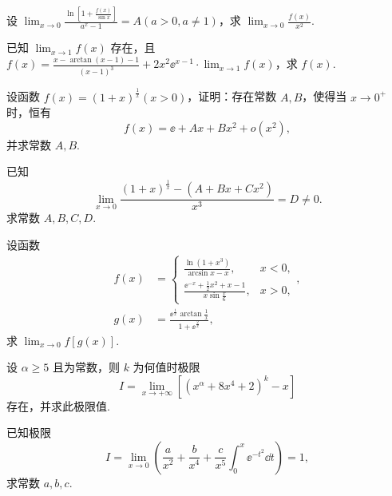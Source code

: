 	\begin{ti}
		设 $\lim_{x \to 0} \frac{\ln\left[ 1 + \frac{f(x)}{\sin x} \right]}{a^{x} - 1} = A (a > 0, a \ne 1)$，求 $\lim_{x \to 0}\frac{f(x)}{x^{2}}$.
	\end{ti}

	\begin{ti}
		已知 $\lim_{x \to 1} f(x)$ 存在，且 $f(x) = \frac{x - \arctan(x - 1) - 1}{(x - 1)^{3}} + 2x^{2} \ee^{x-1} \cdot \lim_{x \to 1} f(x)$，求 $f(x)$.
	\end{ti}

	\begin{ti}
		设函数 $f(x) = (1 + x)^{\frac{1}{x}}(x > 0)$，证明：存在常数 $A,B$，使得当 $x \to 0^{+}$ 时，恒有
		\begin{equation*}
			f(x) = \ee + Ax +Bx^{2} + o\left( x^{2} \right),
		\end{equation*}
		并求常数 $A,B$.
	\end{ti}

	\begin{ti}
		已知
		\[
			\lim_{x \to 0} \frac{(1+x)^{\frac{1}{x}} - \left( A + Bx + Cx^{2} \right)}{x^{3}} = D \ne 0.
		\]
		求常数 $A,B,C,D$.
	\end{ti}

	\begin{ti}
		设函数
		\begin{align*}
			f(x) &= \begin{cases}
				\frac{\ln\left( 1 + x^{3} \right)}{\arcsin x - x}, & x < 0,\\
				\frac{\ee^{-x} + \frac{1}{2}x^{2} + x - 1}{x \sin \frac{x}{6}}, & x > 0,
			\end{cases},\\
			g(x) &= \frac{\ee^{\frac{1}{x}}\arctan\frac{1}{x}}{1 + \ee^{\frac{2}{x}}},
		\end{align*}
		求 $\lim_{x \to 0} f[g(x)]$.
	\end{ti}

	\begin{ti}
		设 $\alpha \geq 5$ 且为常数，则 $k$ 为何值时极限
		\begin{equation*}
			I = \lim_{x \to +\infty} \left[ \left( x^{\alpha} + 8x^{4} + 2 \right)^{k} - x \right]
		\end{equation*}
		存在，并求此极限值.
	\end{ti}
	
	\begin{ti}
		已知极限
		\[
			I = \lim_{x \to 0} \left( \frac{a}{x^{2}} + \frac{b}{x^{4}} + \frac{c}{x^{5}} \int_{0}^{x} \ee^{-t^{2}} \dd{t} \right) = 1,
		\]
		求常数 $a,b,c$.
	\end{ti}

